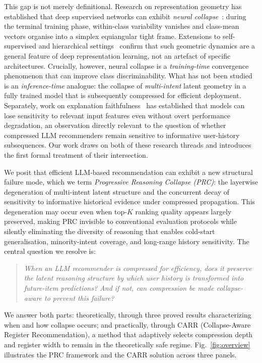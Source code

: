 \documentclass[lettersize,journal]{IEEEtran}
\begin{document}
This gap is not merely definitional. Research on representation geometry has established that deep supervised networks can exhibit \emph{neural collapse}~\cite{papyan2020prevalence}: during the terminal training phase, within-class variability vanishes and class-mean vectors organise into a simplex equiangular tight frame. Extensions to self-supervised and hierarchical settings~\cite{zhu2021geometric,han2022neural} confirm that such geometric dynamics are a general feature of deep representation learning, not an artefact of specific architectures. Crucially, however, neural collapse is a \emph{training-time} convergence phenomenon that can improve class discriminability. What has not been studied is an \emph{inference-time} analogue: the collapse of \emph{multi-intent} latent geometry in a fully trained model that is subsequently compressed for efficient deployment. Separately, work on explanation faithfulness~\cite{jacovi2020towards,lyu2024towards} has established that models can lose sensitivity to relevant input features even without overt performance degradation, an observation directly relevant to the question of whether compressed LLM recommenders remain sensitive to informative user-history subsequences. Our work draws on both of these research threads and introduces the first formal treatment of their intersection.

We posit that efficient LLM-based recommendation can exhibit a new structural failure mode, which we term \emph{Progressive Reasoning Collapse (PRC)}: the layerwise degeneration of multi-intent latent structure and the concurrent decay of sensitivity to informative historical evidence under compressed propagation. This degeneration may occur even when top-$K$ ranking quality appears largely preserved, making PRC invisible to conventional evaluation protocols while silently eliminating the diversity of reasoning that enables cold-start generalisation, minority-intent coverage, and long-range history sensitivity. The central question we resolve is:
\begin{quote}
\emph{When an LLM recommender is compressed for efficiency, does it preserve the latent reasoning structure by which user history is transformed into future-item predictions? And if not, can compression be made collapse-aware to prevent this failure?}
\end{quote}

We answer both parts: theoretically, through three proved results characterizing when and how collapse occurs; and practically, through CARR (Collapse-Aware Register Recommendation), a method that adaptively selects compression depth and register width to remain in the theoretically safe regime. Fig.~\ref{fig:overview} illustrates the PRC framework and the CARR solution across three panels.
\end{document}
